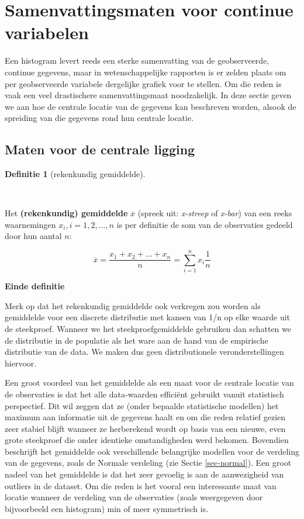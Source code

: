\documentclass[
  dutch,
  letterpaper,
  12pt]{book}
\theoremstyle{definition}
\theoremstyle{definition}
\newtheorem{definition}{Definitie}[chapter]
\theoremstyle{definition}
\theoremstyle{remark}
\begin{document}
\section{Samenvattingsmaten voor continue
variabelen}\label{sec-summarize}

Een histogram levert reeds een sterke samenvatting van de geobserveerde,
continue gegevens, maar in wetenschappelijke rapporten is er zelden
plaats om per geobserveerde variabele dergelijke grafiek voor te
stellen. Om die reden is vaak een veel drastischere samenvattingsmaat
noodzakelijk. In deze sectie geven we aan hoe de centrale locatie van de
gegevens kan beschreven worden, alsook de spreiding van die gegevens
rond hun centrale locatie.

\subsection{Maten voor de centrale
ligging}\label{maten-voor-de-centrale-ligging}

\begin{definition}[rekenkundig
gemiddelde]\protect\hypertarget{def-rekenkundig-gemiddelde}{}\label{def-rekenkundig-gemiddelde}

~

\end{definition}

Het \textbf{(rekenkundig) gemiddelde} \(\overline{x}\) (spreek uit:
\emph{x-streep} of \emph{x-bar}) van een reeks waarnemingen
\(x_i, i=1, 2, \dots, n\) is per definitie de som van de observaties
gedeeld door hun aantal \(n\):

\[\overline{x}= \frac{x_1 + x_2 + \dots + x_n}{n} =\sum_{i=1}^n x_i \frac{1}{n} \]

\textbf{Einde definitie}

Merk op dat het rekenkundig gemiddelde ook verkregen zou worden als
gemiddelde voor een discrete distributie met kansen van 1/n op elke
waarde uit de steekproef. Wanneer we het steekproefgemiddelde gebruiken
dan schatten we de distributie in de populatie als het ware aan de hand
van de empirische distributie van de data. We maken dus geen
distributionele veronderstellingen hiervoor.

Een groot voordeel van het gemiddelde als een maat voor de centrale
locatie van de observaties is dat het alle data-waarden efficiënt
gebruikt vanuit statistisch perspectief. Dit wil zeggen dat ze (onder
bepaalde statistische modellen) het maximum aan informatie uit de
gegevens haalt en om die reden relatief gezien zeer stabiel blijft
wanneer ze herberekend wordt op basis van een nieuwe, even grote
steekproef die onder identieke omstandigheden werd bekomen. Bovendien
beschrijft het gemiddelde ook verschillende belangrijke modellen voor de
verdeling van de gegevens, zoals de Normale verdeling (zie Sectie
\ref{sec-normal}). Een groot nadeel van het gemiddelde is dat het zeer
gevoelig is aan de aanwezigheid van outliers in de dataset. Om die reden
is het vooral een interessante maat van locatie wanneer de verdeling van
de observaties (zoals weergegeven door bijvoorbeeld een histogram) min
of meer symmetrisch is.
\end{document}
